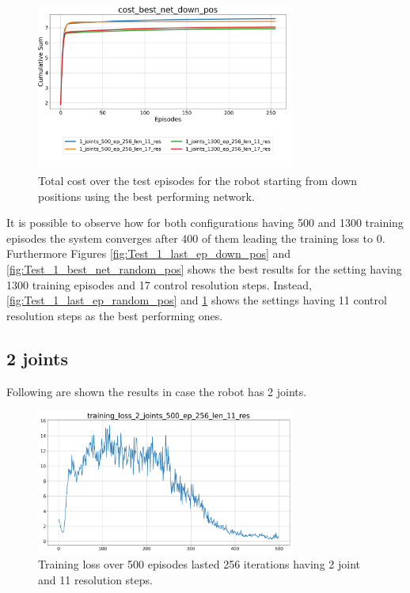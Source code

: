 \documentclass[twocolumn, a4paper]{article}
\begin{document}
\begin{figure}[H]
	\centering
	\includegraphics[width=8.5cm]{"../Figures/Summary_cost_best_net_down_pos_1J.png"}
	\caption{Total cost over the test episodes for the robot starting from
			 down positions using the best performing network.}
	\label{fig:Test_1_best_net_down_pos}
\end{figure}

It is possible to observe how for both configurations having 500 and 1300
training episodes the system converges after 400 of them leading the
training loss to 0. Furthermore Figures \ref{fig:Test_1_last_ep_down_pos} and
\ref{fig:Test_1_best_net_random_pos} shows the best results for the setting having 
1300 training episodes and 17 control resolution steps. Instead,
\ref{fig:Test_1_last_ep_random_pos} and \ref{fig:Test_1_best_net_down_pos} shows the
settings having 11 control resolution steps as the best performing ones.

\subsection{2 joints}
Following are shown the results in case the robot has 2 joints.

\begin{figure}[H]
	\centering
	\includegraphics[width=8.5cm]{"../Figures/training_loss_2J_500E_256EL_11RES.png"}
	\caption{Training loss over 500 episodes lasted 256 iterations having 2
			 joint and 11 resolution steps.}
	\label{fig:TrainLoss_2_500_11}
\end{figure}
\end{document}
